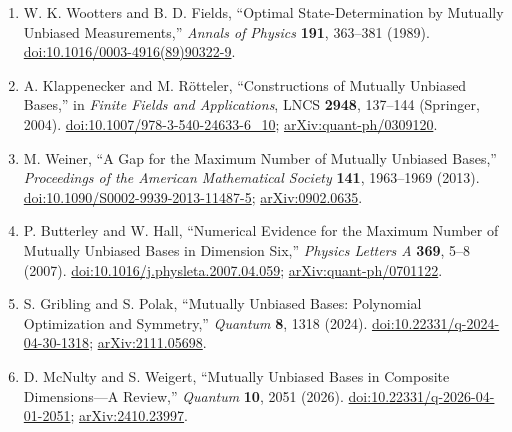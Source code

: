 \begin{enumerate}[label={},leftmargin=4.8em,labelsep=0.5em]
  \footnotesize
  \item[\textup{[WF89]}]\label{ref:p44-wootters-fields}
  W. K. Wootters and B. D. Fields,
  ``Optimal State-Determination by Mutually Unbiased Measurements,''
  \emph{Annals of Physics} \textbf{191}, 363--381 (1989).
  \href{https://doi.org/10.1016/0003-4916(89)90322-9}{doi:10.1016/0003-4916(89)90322-9}.

  \item[\textup{[KR04]}]\label{ref:p44-klappenecker-roetteler}
  A. Klappenecker and M. R\"otteler,
  ``Constructions of Mutually Unbiased Bases,'' in
  \emph{Finite Fields and Applications}, LNCS \textbf{2948}, 137--144
  (Springer, 2004).
  \href{https://doi.org/10.1007/978-3-540-24633-6_10}{doi:10.1007/978-3-540-24633-6\_10};
  \href{https://arxiv.org/abs/quant-ph/0309120}{arXiv:quant-ph/0309120}.

  \item[\textup{[Wei13]}]\label{ref:p44-weiner}
  M. Weiner, ``A Gap for the Maximum Number of Mutually Unbiased Bases,''
  \emph{Proceedings of the American Mathematical Society} \textbf{141},
  1963--1969 (2013).
  \href{https://doi.org/10.1090/S0002-9939-2013-11487-5}{doi:10.1090/S0002-9939-2013-11487-5};
  \href{https://arxiv.org/abs/0902.0635}{arXiv:0902.0635}.

  \item[\textup{[BH07]}]\label{ref:p44-butterley-hall}
  P. Butterley and W. Hall,
  ``Numerical Evidence for the Maximum Number of Mutually Unbiased Bases in
  Dimension Six,'' \emph{Physics Letters A} \textbf{369}, 5--8 (2007).
  \href{https://doi.org/10.1016/j.physleta.2007.04.059}{doi:10.1016/j.physleta.2007.04.059};
  \href{https://arxiv.org/abs/quant-ph/0701122}{arXiv:quant-ph/0701122}.

  \item[\textup{[GP24]}]\label{ref:p44-gribling-polak}
  S. Gribling and S. Polak,
  ``Mutually Unbiased Bases: Polynomial Optimization and Symmetry,''
  \emph{Quantum} \textbf{8}, 1318 (2024).
  \href{https://doi.org/10.22331/q-2024-04-30-1318}{doi:10.22331/q-2024-04-30-1318};
  \href{https://arxiv.org/abs/2111.05698}{arXiv:2111.05698}.

  \item[\textup{[MW26]}]\label{ref:p44-mcnulty-weigert}
  D. McNulty and S. Weigert,
  ``Mutually Unbiased Bases in Composite Dimensions---A Review,''
  \emph{Quantum} \textbf{10}, 2051 (2026).
  \href{https://doi.org/10.22331/q-2026-04-01-2051}{doi:10.22331/q-2026-04-01-2051};
  \href{https://arxiv.org/abs/2410.23997}{arXiv:2410.23997}.


\end{enumerate}
